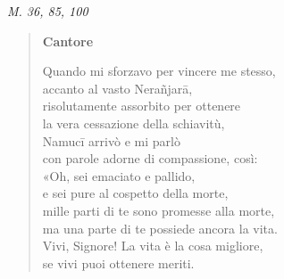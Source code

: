 \emph{M. 36, 85, 100}


\begin{quotation}
\textbf{Cantore}


Quando mi sforzavo per vincere me stesso, \\
accanto al vasto Nerañjarā, \\
risolutamente assorbito per ottenere \\
la vera cessazione della schiavitù, \\
Namucī arrivò e mi parlò \\
con parole adorne di compassione, così: \\
«Oh, sei emaciato e pallido, \\
e sei pure al cospetto della morte, \\
mille parti di te sono promesse alla morte, \\
ma una parte di te possiede ancora la vita. \\
Vivi, Signore! La vita è la cosa migliore, \\
se vivi puoi ottenere meriti.



\end{quotation}
